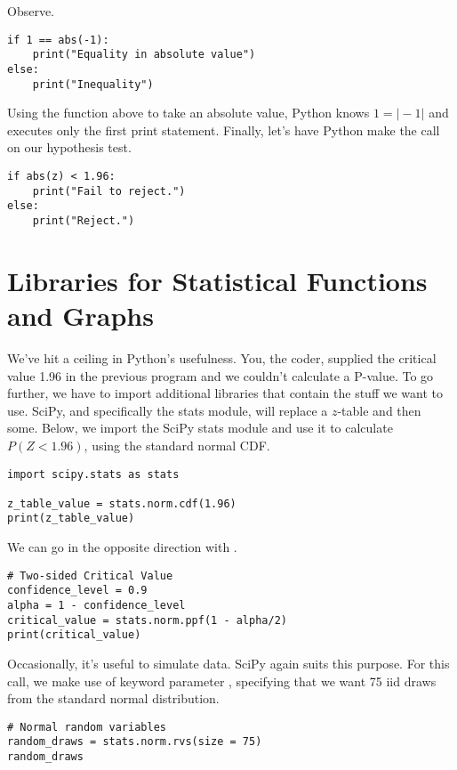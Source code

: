 \documentclass{article}
\begin{document}
\noindent Observe.

\begin{lstlisting}
if 1 == abs(-1):
    print("Equality in absolute value")
else:
    print("Inequality")
\end{lstlisting}

\noindent Using the  function above to take an absolute value, Python knows $1 = \vert -1 \vert$ and executes only the first print statement. Finally, let's have Python make the call on our hypothesis test. 

\begin{lstlisting}
if abs(z) < 1.96:
    print("Fail to reject.")
else:
    print("Reject.")
\end{lstlisting}

\section{Libraries for Statistical Functions and Graphs}
We've hit a ceiling in Python's usefulness. You, the coder, supplied the critical value 1.96 in the previous program and we couldn't calculate a P-value. To go further, we have to import additional libraries that contain the stuff we want to use. SciPy, and specifically the stats module, will replace a $z$-table and then some. Below, we import the SciPy stats module and use it to calculate $P(Z < 1.96)$, using the standard normal CDF.

\begin{lstlisting}
import scipy.stats as stats

z_table_value = stats.norm.cdf(1.96)
print(z_table_value)
\end{lstlisting}

\noindent We can go in the opposite direction with . 

\begin{lstlisting}
# Two-sided Critical Value
confidence_level = 0.9
alpha = 1 - confidence_level
critical_value = stats.norm.ppf(1 - alpha/2)
print(critical_value)
\end{lstlisting}

Occasionally, it's useful to simulate data. SciPy again suits this purpose. For this call, we make use of keyword parameter , specifying that we want 75 iid draws from the standard normal distribution. 

\begin{lstlisting}
# Normal random variables
random_draws = stats.norm.rvs(size = 75)
random_draws
\end{lstlisting}
\end{document}
